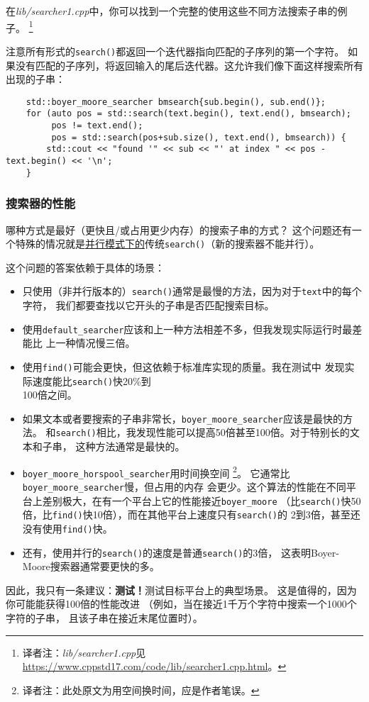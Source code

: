 在\emph{lib/searcher1.cpp}中，你可以找到一个完整的使用这些不同方法搜索子串的例子。
\footnote{译者注：\emph{lib/searcher1.cpp}见\url{https://www.cppstd17.com/code/lib/searcher1.cpp.html}。}

注意所有形式的\texttt{search()}都返回一个迭代器指向匹配的子序列的第一个字符。
如果没有匹配的子序列，将返回输入的尾后迭代器。这允许我们像下面这样搜索所有出现的子串：
\begin{lstlisting}
    std::boyer_moore_searcher bmsearch{sub.begin(), sub.end()};
    for (auto pos = std::search(text.begin(), text.end(), bmsearch);
         pos != text.end();
         pos = std::search(pos+sub.size(), text.end(), bmsearch)) {
        std::cout << "found '" << sub << "' at index " << pos - text.begin() << '\n';
    }
\end{lstlisting}

\subsubsection{搜索器的性能}
哪种方式是最好（更快且/或占用更少内存）的搜索子串的方式？
这个问题还有一个特殊的情况就是\hyperref[ch22]{并行模式下的}传统\texttt{search()}（新的搜索器不能并行）。

这个问题的答案依赖于具体的场景：
\begin{itemize}
    \item 只使用（非并行版本的）\texttt{search()}通常是最慢的方法，因为对于\texttt{text}中的每个字符，
    我们都要查找以它开头的子串是否匹配搜索目标。
    \item 使用\texttt{default\_searcher}应该和上一种方法相差不多，但我发现实际运行时最差能比
    上一种情况慢三倍。
    \item 使用\texttt{find()}可能会更快，但这依赖于标准库实现的质量。我在测试中
    发现实际速度能比\texttt{search()}快20\%到\\
    100倍之间。
    \item 如果文本或者要搜索的子串非常长，\texttt{boyer\_moore\_searcher}应该是最快的方法。
    和\texttt{search()}相比，我发现性能可以提高50倍甚至100倍。对于特别长的文本和子串，
    这种方法通常是最快的。
    \item \texttt{boyer\_moore\_horspool\_searcher}用时间换空间
    \footnote{译者注：此处原文为用空间换时间，应是作者笔误。}。
    它通常比\texttt{boyer\_moore\_searcher}慢，但占用的内存
    会更少。这个算法的性能在不同平台上差别极大，在有一个平台上它的性能接近\texttt{boyer\_moore}
    （比\texttt{search()}快50倍，比\texttt{find()}快10倍），而在其他平台上速度只有\texttt{search()}的
    2到3倍，甚至还没有使用\texttt{find()}快。
    \item 还有，使用并行的\texttt{search()}的速度是普通\texttt{search()}的3倍，
    这表明Boyer-Moore搜索器通常要更快的多。
\end{itemize}
因此，我只有一条建议：\textbf{测试！}测试目标平台上的典型场景。
这是值得的，因为你可能能获得100倍的性能改进
（例如，当在接近1千万个字符中搜索一个1000个字符的子串，
且该子串在接近末尾位置时）。

